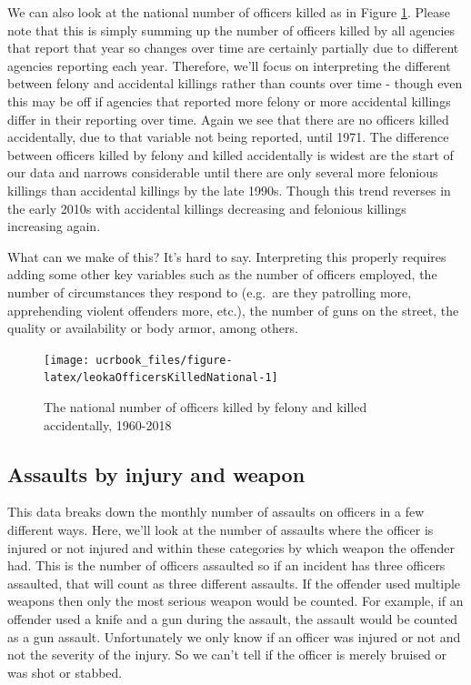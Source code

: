 \documentclass[
  12pt,
  openany]{book}
\begin{document}
We can also look at the national number of officers killed as in Figure \ref{fig:leokaOfficersKilledNational}. Please note that this is simply summing up the number of officers killed by all agencies that report that year so changes over time are certainly partially due to different agencies reporting each year. Therefore, we'll focus on interpreting the different between felony and accidental killings rather than counts over time - though even this may be off if agencies that reported more felony or more accidental killings differ in their reporting over time. Again we see that there are no officers killed accidentally, due to that variable not being reported, until 1971. The difference between officers killed by felony and killed accidentally is widest are the start of our data and narrows considerable until there are only several more felonious killings than accidental killings by the late 1990s. Though this trend reverses in the early 2010s with accidental killings decreasing and felonious killings increasing again.

What can we make of this? It's hard to say. Interpreting this properly requires adding some other key variables such as the number of officers employed, the number of circumstances they respond to (e.g.~are they patrolling more, apprehending violent offenders more, etc.), the number of guns on the street, the quality or availability or body armor, among others.

\begin{figure}

{\centering \texttt{[image: ucrbook\_files/figure-latex/leokaOfficersKilledNational-1]} 

}

\caption{The national number of officers killed by felony and killed accidentally, 1960-2018}\label{fig:leokaOfficersKilledNational}
\end{figure}

\hypertarget{assaults-by-injury-and-weapon}{%
\subsection{Assaults by injury and weapon}\label{assaults-by-injury-and-weapon}}

This data breaks down the monthly number of assaults on officers in a few different ways. Here, we'll look at the number of assaults where the officer is injured or not injured and within these categories by which weapon the offender had. This is the number of officers assaulted so if an incident has three officers assaulted, that will count as three different assaults. If the offender used multiple weapons then only the most serious weapon would be counted. For example, if an offender used a knife and a gun during the assault, the assault would be counted as a gun assault. Unfortunately we only know if an officer was injured or not and not the severity of the injury. So we can't tell if the officer is merely bruised or was shot or stabbed.
\end{document}
